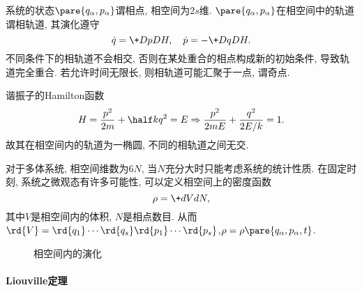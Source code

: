 \documentclass{ctexart}
\begin{document}
系统的状态$\pare{q_\alpha,p_\alpha}$谓相点, 相空间为$2s$维. $\pare{q_\alpha,p_\alpha}$在相空间中的轨道谓相轨道, 其演化遵守
\[ \dot{q} = \+DpDH,\quad \dot{p} = -\+DqDH. \]
不同条件下的相轨道不会相交, 否则在某处重合的相点构成新的初始条件, 导致轨道完全重合. 若允许时间无限长, 则相轨道可能汇聚于一点, 谓奇点.
\begin{ex}
    谐振子的Hamilton函数
    \[ H = \frac{p^2}{2m} + \half kq^2 = E \Rightarrow \frac{p^2}{2mE} + \frac{q^2}{2E/k} = 1. \]
    故其在相空间内的轨道为一椭圆, 不同的相轨道之间无交.
\end{ex}
对于多体系统, 相空间维数为$6N$, 当$N$充分大时只能考虑系统的统计性质. 在固定时刻, 系统之微观态有许多可能性, 可以定义相空间上的密度函数
\[ \rho = \+dVdN, \]
其中$V$是相空间内的体积, $N$是相点数目. 从而$\rd{V} = \rd{q_1}\cdots \rd{q_s}\rd{p_1}\cdots\rd{p_s}$,\quad $\rho = \rho\pare{q_\alpha,p_\alpha,t}$.


\begin{figure}
    \centering
    \caption{相空间内的演化}
    \label{fig:相空间内的演化}
\end{figure}

\paragraph{Liouville定理} %
\label{par:liouville定理}
\end{document}
